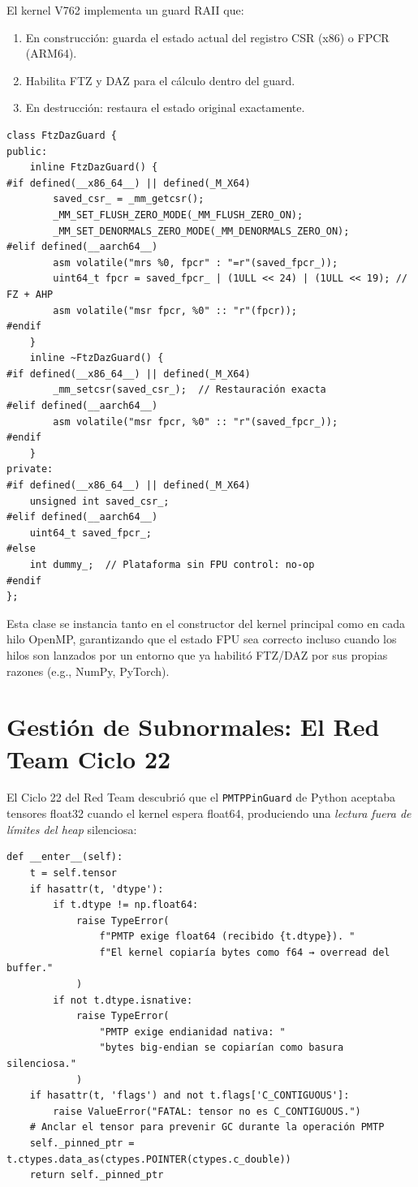 El kernel V762 implementa un guard RAII que:
\begin{enumerate}
\item En construcción: guarda el estado actual del registro CSR (x86) o FPCR (ARM64).
\item Habilita FTZ y DAZ para el cálculo dentro del guard.
\item En destrucción: restaura el estado original exactamente.
\end{enumerate}

\begin{verbatim}
class FtzDazGuard {
public:
    inline FtzDazGuard() {
#if defined(__x86_64__) || defined(_M_X64)
        saved_csr_ = _mm_getcsr();
        _MM_SET_FLUSH_ZERO_MODE(_MM_FLUSH_ZERO_ON);
        _MM_SET_DENORMALS_ZERO_MODE(_MM_DENORMALS_ZERO_ON);
#elif defined(__aarch64__)
        asm volatile("mrs %0, fpcr" : "=r"(saved_fpcr_));
        uint64_t fpcr = saved_fpcr_ | (1ULL << 24) | (1ULL << 19); // FZ + AHP
        asm volatile("msr fpcr, %0" :: "r"(fpcr));
#endif
    }
    inline ~FtzDazGuard() {
#if defined(__x86_64__) || defined(_M_X64)
        _mm_setcsr(saved_csr_);  // Restauración exacta
#elif defined(__aarch64__)
        asm volatile("msr fpcr, %0" :: "r"(saved_fpcr_));
#endif
    }
private:
#if defined(__x86_64__) || defined(_M_X64)
    unsigned int saved_csr_;
#elif defined(__aarch64__)
    uint64_t saved_fpcr_;
#else
    int dummy_;  // Plataforma sin FPU control: no-op
#endif
};
\end{verbatim}

Esta clase se instancia tanto en el constructor del kernel principal como
en cada hilo OpenMP, garantizando que el estado FPU sea correcto incluso
cuando los hilos son lanzados por un entorno que ya habilitó FTZ/DAZ por
sus propias razones (e.g., NumPy, PyTorch).

\section{Gestión de Subnormales: El Red Team Ciclo 22}

El Ciclo 22 del Red Team descubrió que el \texttt{PMTPPinGuard} de Python aceptaba
tensores float32 cuando el kernel espera float64, produciendo una \textit{lectura
fuera de límites del heap} silenciosa:

\begin{verbatim}
def __enter__(self):
    t = self.tensor
    if hasattr(t, 'dtype'):
        if t.dtype != np.float64:
            raise TypeError(
                f"PMTP exige float64 (recibido {t.dtype}). "
                f"El kernel copiaría bytes como f64 → overread del buffer."
            )
        if not t.dtype.isnative:
            raise TypeError(
                "PMTP exige endianidad nativa: "
                "bytes big-endian se copiarían como basura silenciosa."
            )
    if hasattr(t, 'flags') and not t.flags['C_CONTIGUOUS']:
        raise ValueError("FATAL: tensor no es C_CONTIGUOUS.")
    # Anclar el tensor para prevenir GC durante la operación PMTP
    self._pinned_ptr = t.ctypes.data_as(ctypes.POINTER(ctypes.c_double))
    return self._pinned_ptr
\end{verbatim}

